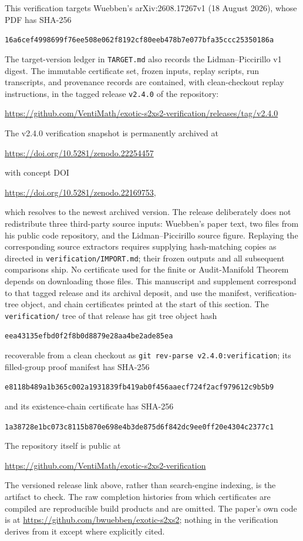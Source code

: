 \documentclass[11pt]{article}
\theoremstyle{definition}
\begin{document}
This verification targets Wuebben's arXiv:2608.17267v1 (18 August 2026),
whose PDF has SHA-256
\begin{center}\small\texttt{16a6cef4998699f76ee508e062f8192cf80eeb478b7e077bfa35ccc25350186a}\end{center}
The target-version ledger in \texttt{TARGET.md} also records the
Lidman--Piccirillo v1 digest.  The immutable certificate set,
frozen inputs, replay scripts, run transcripts, and provenance records are
contained, with clean-checkout replay instructions, in the tagged release
\texttt{v2.4.0} of the repository:
\begin{center}\small\url{https://github.com/VentiMath/exotic-s2xs2-verification/releases/tag/v2.4.0}\end{center}
The v2.4.0 verification snapshot is permanently archived at
\begin{center}\small\url{https://doi.org/10.5281/zenodo.22254457}\end{center}
with concept DOI
\begin{center}\small\url{https://doi.org/10.5281/zenodo.22169753},\end{center}
which resolves to the newest archived version.
The release deliberately does not redistribute three third-party source
inputs: Wuebben's paper text, two files from his public code repository, and
the Lidman--Piccirillo source figure. Replaying the corresponding source
extractors requires supplying hash-matching copies as directed in
\texttt{verification/IMPORT.md}; their frozen outputs and all subsequent
comparisons ship. No certificate used for the finite or Audit-Manifold
Theorem depends on downloading those files.
This manuscript and supplement correspond to that tagged release and its
archival deposit, and use the manifest, verification-tree object, and chain
certificates printed at the start of this section.
The \texttt{verification/} tree of that release has git tree object hash
\begin{center}\small\texttt{eea43135efbd0f2f8b0d8879e28aa4be2ade85ea}\end{center}
recoverable from a clean checkout as
\texttt{git rev-parse v2.4.0:verification};
its filled-group proof manifest has SHA-256
\begin{center}\small\texttt{e8118b489a1b365c002a1931839fb419ab0f456aaecf724f2acf979612c9b5b9}\end{center}
and its existence-chain certificate has SHA-256
\begin{center}\small\texttt{1a38728e1bc073c8115b870e698e4b3de875d6f842dc9ee0ff20e4304c2377c1}\end{center}
The repository itself is public at
\begin{center}\small
\url{https://github.com/VentiMath/exotic-s2xs2-verification}
\end{center}
The versioned release link above, rather than search-engine indexing, is the
artifact to check. The raw completion histories from which certificates are compiled are
reproducible build products and are omitted. The paper's own code is at
\url{https://github.com/bwuebben/exotic-s2xs2}; nothing in the
verification derives from it except where explicitly cited.
\end{document}
